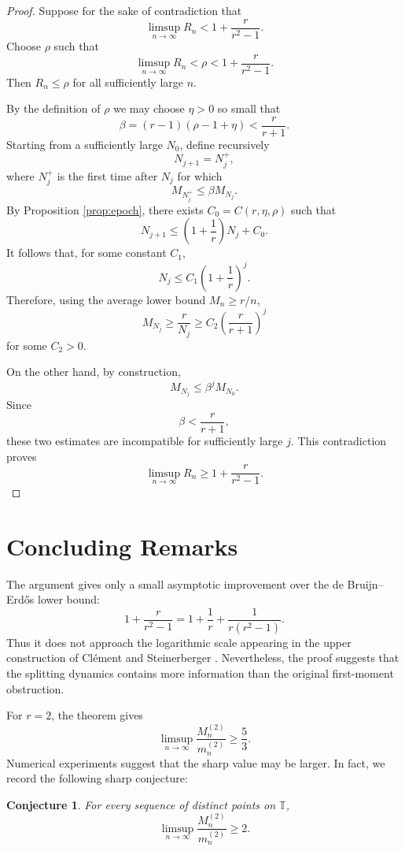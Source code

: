 \documentclass[11pt]{article}
\newtheorem{conjecture}[theorem]{Conjecture}
\theoremstyle{remark}
\begin{document}
\begin{proof}
Suppose for the sake of contradiction that
\[
    \limsup_{n\to\infty} R_n
    <
    1+\frac{r}{r^2-1}.
\]
Choose $\rho$ such that
\[
    \limsup_{n\to\infty}R_n<\rho<1+\frac{r}{r^2-1}.
\]
Then $R_n\leq\rho$ for all sufficiently large $n$.

\bigskip
\noindent
By the definition of $\rho$ we may choose $\eta>0$ so small that
\[
    \beta=(r-1)(\rho-1+\eta)<\frac{r}{r+1}.
\]
Starting from a sufficiently large $N_0$, define recursively
\[
    N_{j+1}=N_j^+,
\]
where $N_j^+$ is the first time after $N_j$ for which
\[
    M_{N_j^+}\leq \beta M_{N_j}.
\]
By Proposition \ref{prop:epoch}, there exists $C_0=C(r,\eta,\rho)$ such that
\[
    N_{j+1}\leq \left(1+\frac1r\right)N_j+C_0.
\]
It follows that, for some constant $C_1$,
\[
    N_j\leq C_1\left(1+\frac1r\right)^j .
\]
Therefore, using the average lower bound $M_n\geq r/n$,
\[
    M_{N_j}
    \geq
    \frac{r}{N_j}
    \geq
    C_2\left(\frac{r}{r+1}\right)^j
\]
for some $C_2>0$.

\bigskip
\noindent
On the other hand, by construction,
\[
    M_{N_j}\leq \beta^j M_{N_0}.
\]
Since
\[
    \beta<\frac{r}{r+1},
\]
these two estimates are incompatible for sufficiently large $j$. This contradiction proves
\[
    \limsup_{n\to\infty}R_n
    \geq
    1+\frac{r}{r^2-1}.
\]
\end{proof}

\section{Concluding Remarks}

The argument gives only a small asymptotic improvement over the de Bruijn--Erd\H{o}s lower bound:
\[
    1+\frac{r}{r^2-1}
    =
    1+\frac1r+\frac{1}{r(r^2-1)}.
\]
Thus it does not approach the logarithmic scale appearing in the upper construction of Cl\'ement and Steinerberger \cite{clement-steinerberger}. Nevertheless, the proof suggests that the splitting dynamics contains more information than the original first-moment obstruction.

\bigskip
\noindent
For $r=2$, the theorem gives
\[
    \limsup_{n\to\infty}\frac{M_n^{(2)}}{m_n^{(2)}}\geq \frac53.
\]
Numerical experiments suggest that the sharp value may be larger. In fact, we record the following sharp conjecture:

\smallskip
\begin{conjecture}\label{conj:r2}
For every sequence of distinct points on $\mathbb T$,
\[
    \limsup_{n\to\infty}
    \frac{M_n^{(2)}}{m_n^{(2)}}
    \geq 2.
\]
\end{conjecture}
\end{document}
